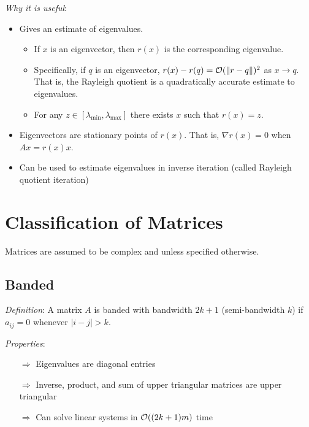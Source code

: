 \documentclass[12pt]{article}
\begin{document}
\textit{Why it is useful}:
\begin{itemize}[nolistsep]
    \item Gives an estimate of eigenvalues.
        \begin{itemize}[nolistsep]
            \item If \( x \) is an eigenvector, then \( r(x) \) is the corresponding eigenvalue.
            \item Specifically, if \( q \) is an eigenvector, \( r(x) - r(q) = \mathcal{O}(\left\lVert r-q\right\rVert)^2 \) as \( x\to q \). That is, the Rayleigh quotient is a quadratically accurate estimate to eigenvalues.
            \item For any \( z\in[\lambda_{\text{min}},\lambda_{\text{max}}] \) there exists \( x \) such that \( r(x) = z \).
        \end{itemize}
    \item Eigenvectors are stationary points of \( r(x) \). That is, \( \nabla r(x) = 0 \) when \( Ax = r(x) x \).
    \item Can be used to estimate eigenvalues in inverse iteration (called Rayleigh quotient iteration)
\end{itemize}





\pagebreak
\section{Classification of Matrices}
Matrices are assumed to be complex and unless specified otherwise.

\subsection{Banded}
\textit{Definition}: A matrix \( A \) is banded with bandwidth \( 2k+1 \) (semi-bandwidth \( k \)) if \( a_{ij} = 0 \) whenever \( |i-j| > k \).

\textit{Properties}:
\begin{itemize}[nolistsep]
    \item[\(\Rightarrow\)] Eigenvalues are diagonal entries
    \item[\(\Rightarrow\)] Inverse, product, and sum of upper triangular matrices are upper triangular
    \item[\(\Rightarrow\)] Can solve linear systems in \( \mathcal{O}((2k+1)m) \) time
\end{itemize}
\end{document}
